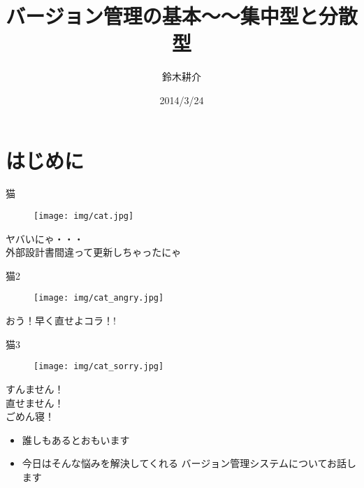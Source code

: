 \documentclass[dvipdfmx]{beamer}
\title{バージョン管理の基本〜〜集中型と分散型}
\author{鈴木耕介}
\institute[]{}
\date{2014/3/24}
\begin{document}
\frame{\titlepage}

\section{はじめに}
\begin{frame}{猫}
\begin{center}
\begin{figure}
\texttt{[image: img/cat.jpg]}
\end{figure}
\end{center}
\vspace{5cm}
ヤバいにゃ・・・\\
外部設計書\alert{間違って更新}しちゃったにゃ
\end{frame}

\begin{frame}{猫2}
\begin{center}
\begin{figure}
\texttt{[image: img/cat\_angry.jpg]}
\end{figure}
\end{center}
\vspace{5cm}
\alert{\huge{おう！早く直せよコラ！!}}\\	
\end{frame}

\begin{frame}{猫3}
\begin{center}
\begin{figure}
\texttt{[image: img/cat\_sorry.jpg]}
\end{figure}
\end{center}	
\alert{すんません！\\直せません！\\ごめん寝！}
\end{frame}

\begin{frame}
\begin{itemize}
\item \rm{\Huge{誰しもあるとおもいます}}
\end{itemize}
\end{frame}

\begin{frame}
\begin{itemize}
\item \rm{\Huge{今日はそんな悩みを解決してくれる
バージョン管理システムについてお話します}}
\end{itemize}
\end{frame}
\end{document}
